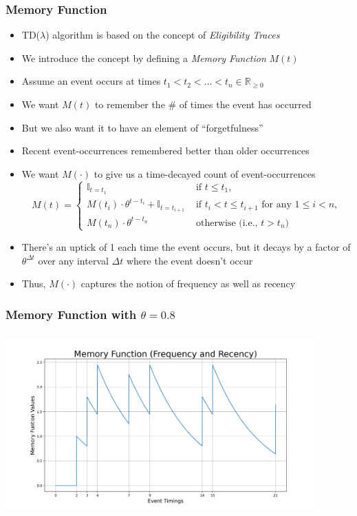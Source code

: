 \documentclass[handout]{beamer}
\begin{document}
\begin{frame}
\frametitle{Memory Function}
\pause
\begin{itemize}[<+->]
\item TD($\lambda$) algorithm is based on the concept of {\em Eligibility Traces}
\item We introduce the concept by defining a {\em Memory Function} $M(t)$
\item Assume an event occurs at times $t_1 < t_2 < \ldots < t_n \in \mathbb{R}_{\geq 0}$
\item We want $M(t)$ to remember the \# of times the event has occurred
\item But we also want it to have an element of ``forgetfulness''
\item Recent event-occurrences remembered better than older occurrences
\item  We want $M(\cdot)$ to give us a time-decayed count of event-occurrences
\begin{equation*}
M(t) = 
\begin{cases}
\mathbb{I}_{t=t_1} & \text{ if } t \leq t_1, \\
M(t_i) \cdot \theta^{t - t_i} + \mathbb{I}_{t=t_{i+1}}& \text{ if }  t_i < t \leq t_{i+1} \text{ for any } 1 \leq i < n, \\
M(t_n) \cdot \theta^{t - t_n} & \text{ otherwise (i.e., } t > t_n)
\end{cases}
\end{equation*}
\item There's an uptick of 1 each time the event occurs, but it decays by a factor of $\theta^{\Delta t}$ over any interval $\Delta t$ where the event doesn't occur
\item Thus, $M(\cdot)$ captures the notion of frequency as well as recency
\end{itemize}
\end{frame}

\begin{frame}
\frametitle{Memory Function with $\theta = 0.8$}
\includegraphics[width=12cm, height=7cm]{memory_function.png}
\end{frame}
\end{document}
